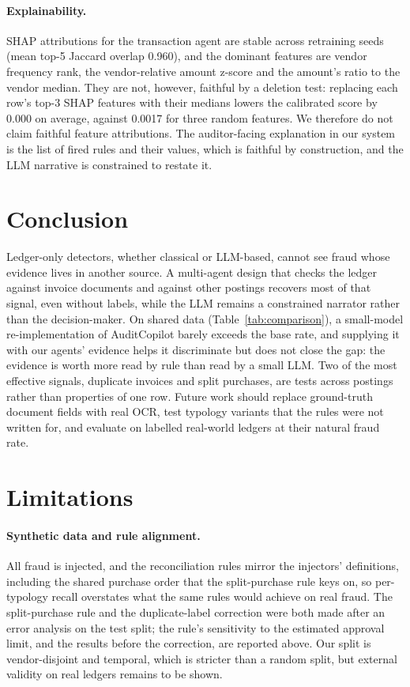 \documentclass{article}
\begin{document}
\paragraph{Explainability.} SHAP attributions \citep{lundberg2017unified} for the transaction agent are stable across retraining seeds (mean top-5 Jaccard overlap 0.960), and the dominant features are vendor frequency rank, the vendor-relative amount z-score and the amount's ratio to the vendor median. They are not, however, faithful by a deletion test: replacing each row's top-3 SHAP features with their medians lowers the calibrated score by 0.000 on average, against 0.0017 for three random features. We therefore do not claim faithful feature attributions. The auditor-facing explanation in our system is the list of fired rules and their values, which is faithful by construction, and the LLM narrative is constrained to restate it.

\section{Conclusion}

Ledger-only detectors, whether classical or LLM-based, cannot see fraud whose evidence lives in another source. A multi-agent design that checks the ledger against invoice documents and against other postings recovers most of that signal, even without labels, while the LLM remains a constrained narrator rather than the decision-maker. On shared data (Table~\ref{tab:comparison}), a small-model re-implementation of AuditCopilot barely exceeds the base rate, and supplying it with our agents' evidence helps it discriminate but does not close the gap: the evidence is worth more read by rule than read by a small LLM. Two of the most effective signals, duplicate invoices and split purchases, are tests across postings rather than properties of one row. Future work should replace ground-truth document fields with real OCR, test typology variants that the rules were not written for, and evaluate on labelled real-world ledgers at their natural fraud rate.

\section*{Limitations}
\label{sec:limitations}

\paragraph{Synthetic data and rule alignment.} All fraud is injected, and the reconciliation rules mirror the injectors' definitions, including the shared purchase order that the split-purchase rule keys on, so per-typology recall overstates what the same rules would achieve on real fraud. The split-purchase rule and the duplicate-label correction were both made after an error analysis on the test split; the rule's sensitivity to the estimated approval limit, and the results before the correction, are reported above. Our split is vendor-disjoint and temporal, which is stricter than a random split, but external validity on real ledgers remains to be shown.
\end{document}

